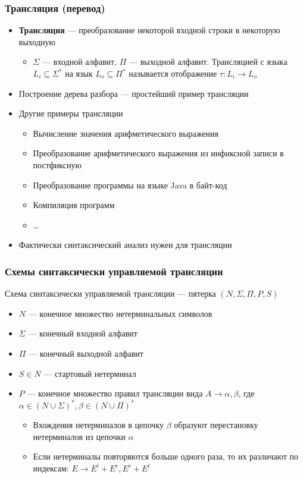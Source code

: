 \documentclass{beamer}
\begin{document}
\begin{frame}[fragile]
  \transwipe[direction=90]
  \frametitle{Трансляция (перевод)}
  \begin{itemize}
    \item \textbf{Трансляция} --- преобразование некоторой входной строки в некоторую выходную
    \begin{itemize}
      \item $\Sigma$ --- входной алфавит, $\Pi$ --- выходной алфавит. Трансляцией с языка $L_i \subseteq \Sigma^*$ на язык $L_o \subseteq \Pi^*$ называется отображение $\tau : L_i \rightarrow L_o$
    \end{itemize}
    \item Построение дерева разбора --- простейший пример трансляции
    \item Другие примеры трансляции
    \begin{itemize}
      \item Вычисление значения арифметического выражения
      \item Преобразование арифметического выражения из инфиксной записи в постфиксную
      \item Преобразование программы на языке Java в байт-код
      \item Компиляция программ
      \item \dots
    \end{itemize}
    \item Фактически синтаксический анализ нужен для трансляции
  \end{itemize}
\end{frame}


\begin{frame}[fragile]
  \transwipe[direction=90]
  \frametitle{Схемы синтаксически управляемой трансляции}
  Схема синтаксически управляемой трансляции --- пятерка $(N, \Sigma, \Pi, P, S)$  
  \begin{itemize}
    \item $N$ --- конечное множество нетерминальных символов
    \item $\Sigma$ --- конечный входной алфавит 
    \item $\Pi$ --- конечный выходной алфавит
    \item $S \in N$ --- стартовый нетерминал
    \item $P$ --- конечное множество правил трансляции вида $A \rightarrow \alpha, \beta$, где $\alpha \in (N \cup \Sigma)^*, \beta \in (N \cup \Pi)^*$
    \begin{itemize}
      \item Вхождения нетерминалов в цепочку $\beta$ образуют перестановку нетерминалов из цепочки $\alpha$
      \item Если нетерминалы повторяются больше одного раза, то их различают по индексам: $E \rightarrow E^l + E^r, E^r + E^l$
    \end{itemize}
  \end{itemize}
\end{frame}
\end{document}
